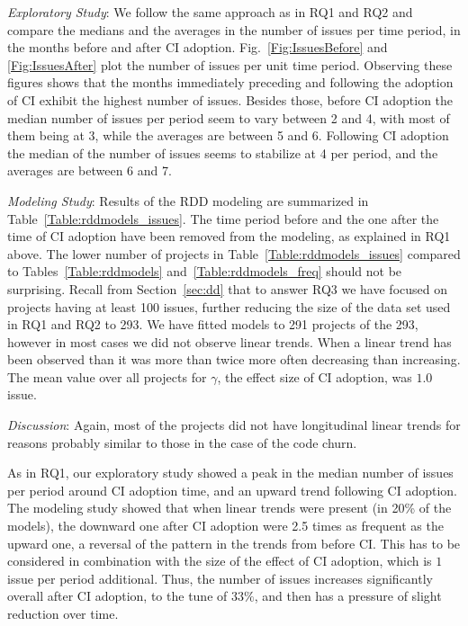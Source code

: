 \smallskip\noindent \emph{Exploratory Study}:
We follow the same approach as in RQ1 and RQ2 and compare the 
medians and the averages in the number of issues per time period, in the 
months before and after CI adoption.
Fig.~\ref{Fig:IssuesBefore} and \ref{Fig:IssuesAfter} plot the number of 
issues per unit time period.
Observing these figures shows that the months immediately preceding 
and following the adoption of CI exhibit the highest number of issues.
Besides those, before CI adoption the median number of issues per period seem to vary between 2 and 4, with most of them being at 3, while the averages are between 5 and 6.
Following CI adoption the median of the number of issues seems to 
stabilize at 4 per period, and the averages are between 6 and 7.



\smallskip\noindent \emph{Modeling Study}:
Results of the RDD modeling are summarized in Table~\ref{Table:rddmodels_issues}.
The time period before and the one after the time of CI adoption have been removed from the modeling, as explained in RQ1 above.
The lower number of projects in Table~\ref{Table:rddmodels_issues} 
compared to Tables~\ref{Table:rddmodels} and~\ref{Table:rddmodels_freq} 
should not be surprising. 
Recall from Section~\ref{sec:dd} that to answer RQ3 we have focused on 
projects having at least 100 issues, further reducing the size of the data set 
used in RQ1 and RQ2 to 293.
We have fitted models to 291 projects of the 293, however in most cases we 
did not observe linear trends.
When a linear trend has been observed than it was more than twice more 
often decreasing than increasing.
The mean value over all projects for $\gamma$, the effect size of CI adoption, 
was $1.0$ issue.


\smallskip\noindent \emph{Discussion}:
Again, most of the projects did not have longitudinal linear trends for reasons probably similar to those in the case of the code churn.

As in RQ1, our exploratory study showed a peak in the median number of issues per period around CI adoption time, and an upward trend following CI adoption.
The modeling study showed that when linear trends were present (in 20\% 
of the models), the downward one after CI adoption were 2.5 times as frequent 
as the upward one, a reversal of the pattern in the trends from before CI.
This has to be considered in combination with the size of the effect of CI adoption, which is $1$ issue per period additional.
Thus, the number of issues increases significantly overall after CI adoption, to the tune of $33\%$, and then has a pressure of slight reduction over time.

